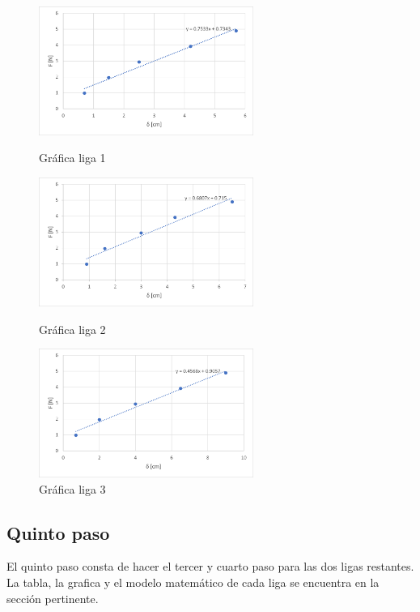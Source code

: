 \documentclass[12pt, titlepage]{report}
\begin{document}
    \begin{figure}[ht]
        \centering
        \begin{minipage}[c]{0.45\linewidth}
            \centering
            \includegraphics[width=7cm]{Graf1.png}
            \caption{Gráfica liga 1}
        \end{minipage}
        \begin{minipage}[c]{0.45\linewidth}
            \centering
            \includegraphics[width=7cm]{Graf2.png}
            \caption{Gráfica liga 2}   
        \end{minipage}
        \par\bigskip
        \begin{minipage}[c]{0.45\linewidth}
            \centering
            \includegraphics[width=7cm]{Graf3.png}
            \caption{Gráfica liga 3}
        \end{minipage}
    \end{figure}
    
    \newpage
    \subsection*{Quinto paso}
    El quinto paso consta de hacer el tercer y cuarto paso para las dos ligas restantes. La tabla, la grafica y el modelo matemático de cada liga se encuentra en la sección pertinente. 
\end{document}
